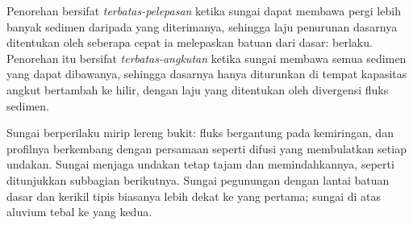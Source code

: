 \begin{definition}\label{def:b3:quantitative-geomorphology:limited}
Penorehan bersifat \emph{terbatas-pelepasan} ketika sungai
dapat membawa pergi lebih banyak sedimen daripada yang diterimanya, sehingga laju penurunan
dasarnya ditentukan oleh seberapa cepat ia melepaskan batuan dari dasar:  berlaku.
Penorehan itu
bersifat \emph{terbatas-angkutan} ketika sungai
membawa semua sedimen yang dapat dibawanya, sehingga dasarnya hanya diturunkan di tempat
kapasitas angkut bertambah ke hilir, dengan laju yang ditentukan oleh divergensi
fluks sedimen.
\end{definition}

Sungai  berperilaku mirip lereng bukit: fluks bergantung
pada kemiringan, dan profilnya berkembang dengan persamaan seperti difusi yang membulatkan
setiap undakan. Sungai  menjaga undakan tetap tajam dan memindahkannya,
seperti ditunjukkan subbagian berikutnya. Sungai pegunungan dengan lantai batuan dasar dan
kerikil tipis biasanya lebih dekat ke yang pertama; sungai di atas aluvium tebal ke yang
kedua.

